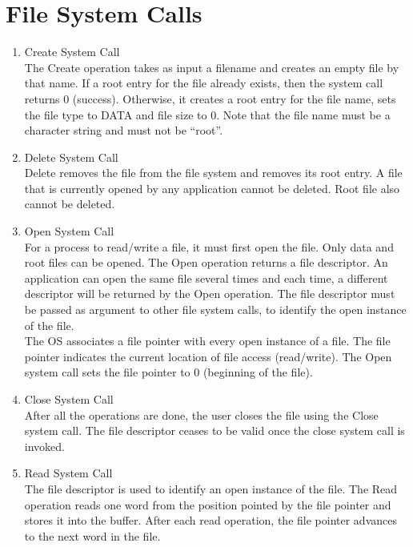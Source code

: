 \section{File System Calls}
\begin{enumerate}
\item{Create System Call}
\vspace{3mm}\\
The Create operation takes as input a filename and creates an empty file by that name. If a root entry for the file already exists, then the system call returns 0 (success). Otherwise, it creates a root entry for the file name, sets the file type to DATA and file size to 0. Note that the file name must be a character string and must not be “root”. 


\item{Delete System Call}
\vspace{3mm}\\
Delete removes the file from the file system and removes its root entry. A file that is currently opened by any application cannot be deleted. Root file also cannot be deleted.
 

\item{Open System Call}
\vspace{3mm}\\
For a process to read/write a file, it must first open the file. Only data and root files can be opened. The Open operation returns a file descriptor. An application can open the same file several times and each time, a different descriptor will be returned by the Open operation. The file descriptor must be passed as argument to other file system calls, to identify the open instance of the file.
\vspace{2mm}\\
The OS associates a file pointer with every open instance of a file. The file pointer indicates the current location of file access (read/write). The Open system call sets the file pointer to 0 (beginning of the file).


\item{Close System Call}
\vspace{2mm}\\
 After all the operations are done, the user closes the file using the Close system call. The file descriptor ceases to be valid once the close system call is invoked. 


\item{Read System Call}
\vspace{2mm}\\
The file descriptor is used to identify an open instance of the file. The Read operation reads one word from the position pointed by the file pointer and stores it into the buffer. After each read operation, the file pointer advances to the next word in the file. 


\end{enumerate}

